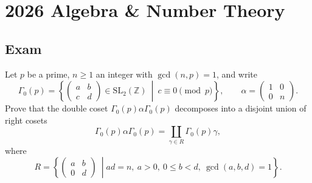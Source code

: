 \section{2026 Algebra \& Number Theory}

\subsection*{Exam}

\begin{exercise}
\label{algebra:2026:1}
Let $p$ be a prime, $n \geq 1$ an integer with $\gcd(n,p)=1$, and write
\[
\Gamma_0(p)=
\left\{
\begin{pmatrix}
a & b\\
c & d
\end{pmatrix}
\in \mathrm{SL}_2(\mathbb{Z})\ \middle|\ c\equiv 0 \pmod p
\right\},
\qquad
\alpha=
\begin{pmatrix}
1 & 0\\
0 & n
\end{pmatrix}.
\]
Prove that the double coset $\Gamma_0(p)\alpha\Gamma_0(p)$ decomposes into a disjoint union of right cosets
\[
\Gamma_0(p)\alpha\Gamma_0(p)=\coprod_{\gamma\in R}\Gamma_0(p)\gamma,
\]
where
\[
R=
\left\{
\begin{pmatrix}
a & b\\
0 & d
\end{pmatrix}
\ \middle|
ad=n,\ a>0,\ 0\leq b<d,\ \gcd(a,b,d)=1
\right\}.
\]
\end{exercise}

